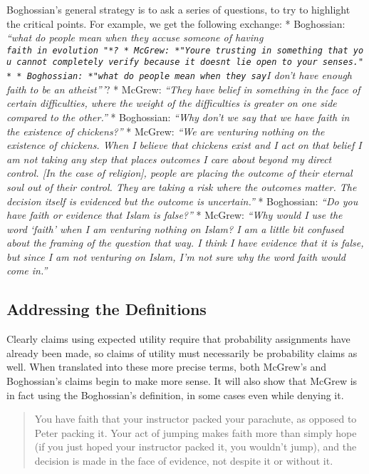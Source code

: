 \documentclass{tufte-book}
\begin{document}
Boghossian's general strategy is to ask a series of questions, to try to
highlight the critical points. For example, we get the following
exchange: * Boghossian: \emph{``what do people mean when they accuse
someone of having
\texttt{faith\ in\ evolution\textquotesingle{}\ "*?\ *\ McGrew:\ *"You\textquotesingle{}re\ trusting\ in\ something\ that\ you\ cannot\ completely\ verify\ because\ it\ doesn\textquotesingle{}t\ lie\ open\ to\ your\ senses."*\ *\ Boghossian:\ *"what\ do\ people\ mean\ when\ they\ say}I
don't have enough faith to be an atheist'''}? * McGrew: \emph{``They
have belief in something in the face of certain difficulties, where the
weight of the difficulties is greater on one side compared to the
other.''} * Boghossian: \emph{``Why don't we say that we have faith in
the existence of chickens?''} * McGrew: \emph{``We are venturing nothing
on the existence of chickens. When I believe that chickens exist and I
act on that belief I am not taking any step that places outcomes I care
about beyond my direct control. {[}In the case of religion{]}, people
are placing the outcome of their eternal soul out of their control. They
are taking a risk where the outcomes matter. The decision itself is
evidenced but the outcome is uncertain.''} * Boghossian: \emph{``Do you
have faith or evidence that Islam is false?''} * McGrew: \emph{``Why
would I use the word `faith' when I am venturing nothing on Islam? I am
a little bit confused about the framing of the question that way. I
think I have evidence that it is false, but since I am not venturing on
Islam, I'm not sure why the word faith would come in.''}

\subsection{Addressing the Definitions}\label{addressing-the-definitions}

Clearly claims using expected utility require that probability
assignments have already been made, so claims of utility must
necessarily be probability claims as well. When translated into these
more precise terms, both McGrew's and Boghossian's claims begin to make
more sense. It will also show that McGrew is in fact using the
Boghossian's definition, in some cases even while denying it.

\begin{quote}
You have faith that your instructor packed your parachute, as opposed to Peter packing it.  Your act of jumping makes faith more than simply hope (if you just hoped your instructor packed it, you wouldn't jump), and the decision is made in the face of evidence, not despite it or without
it.
\end{quote}
\end{document}
